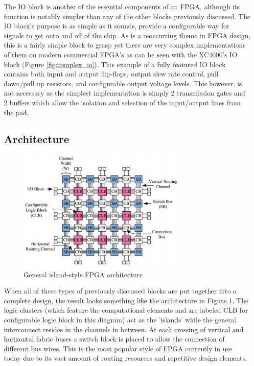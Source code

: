 \documentclass[12pt]{article}
\begin{document}
The IO block is another of the essential components of an FPGA, although its function
is notably simpler than any of the other blocks previously discussed. The IO block's
purpose is as simple as it sounds, provide a configurable way for signals to get onto and off of
the chip. As is a reoccurring theme in FPGA design, this is a fairly simple block to
grasp yet there are very complex implementations of them on modern commercial FPGA's
as can be seen with the XC4000's IO block (Figure \ref{fig:complex_io}). This example of
a fully featured IO block contains both input and output flip-flops, output slew rate
control, pull down/pull up resistors, and configurable output voltage levels. This
however, is not necessary as the simplest implementation is simply 2 transmission gates
and 2 buffers which allow the isolation and selection of the input/output lines from
the pad.

\subsection{Architecture} \label{Architecture}

\begin{figure}[ht]
    \centering
    \includegraphics[width=0.75\textwidth]{generalarch}
    \caption{General island-style FPGA architecture \cite{fpga_arch_overview}}
    \label{fig:island_style}
\end{figure}

When all of these types of previously discussed blocks are put together into a complete
design, the result looks something like the architecture in Figure \ref{fig:island_style}.
The logic clusters (which
feature the computational elements and are labeled CLB for configurable logic block in this
 diagram) act as the 'islands' while the general interconnect
resides in the channels in between. At each crossing of vertical and horizontal fabric
buses a switch block is placed to allow the connection of different bus wires. This is
the most popular style of FPGA currently in use today due to its vast amount of routing
resources and repetitive design elements.
\end{document}
